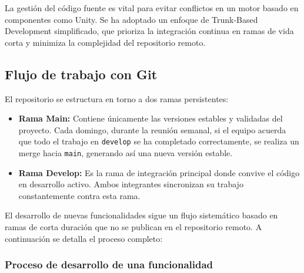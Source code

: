 La gestión del código fuente es vital para evitar conflictos en un motor 
basado en componentes como Unity. Se ha adoptado un enfoque de Trunk-Based Development 
simplificado, que prioriza la integración continua en ramas de vida corta y minimiza 
la complejidad del repositorio remoto.

\subsection{Flujo de trabajo con Git}

El repositorio se estructura en torno a dos ramas persistentes:

\begin{itemize}
    \item \textbf{Rama Main:} Contiene únicamente las versiones estables y 
    validadas del proyecto. Cada domingo, durante la reunión semanal, si el equipo 
    acuerda que todo el trabajo en \texttt{develop} se ha completado correctamente, 
    se realiza un merge hacia \texttt{main}, generando así una nueva versión estable.
    
    \item \textbf{Rama Develop:} Es la rama de integración principal donde convive 
    el código en desarrollo activo. Ambos integrantes sincronizan su trabajo 
    constantemente contra esta rama.
\end{itemize}

El desarrollo de nuevas funcionalidades sigue un flujo sistemático basado en 
ramas de corta duración que no se publican en el repositorio remoto. 
A continuación se detalla el proceso completo:

\subsubsection{Proceso de desarrollo de una funcionalidad}

